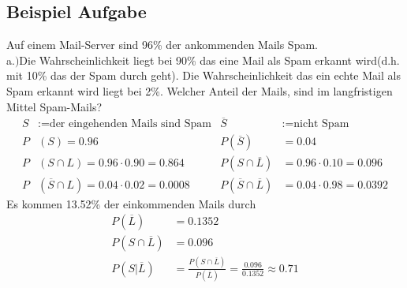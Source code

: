\subsection*{Beispiel Aufgabe}
Auf einem Mail-Server sind 96\% der ankommenden Mails Spam.\\
a.$)$Die Wahrscheinlichkeit liegt bei 90\% das eine Mail als Spam erkannt wird(d.h. mit 10\% das der Spam durch geht). Die Wahrscheinlichkeit das ein echte Mail als Spam erkannt wird liegt bei 2\%. Welcher Anteil der Mails, sind im langfristigen Mittel Spam-Mails?
\begin{align*}
    S&:= \textrm{der eingehenden Mails sind Spam} &\overline{S}&:= \textrm{nicht Spam}\\
    P&(S)=0.96 &P(\overline{S})&=0.04\\
    P&(S\cap L)= 0.96\cdot 0.90=0.864  &P(S\cap\overline{L})&=0.96\cdot0.10 = 0.096\\
    P&(\overline{S}\cap L)= 0.04\cdot 0.02 = 0.0008 &P(\overline{S}\cap\overline{L})&=0.04\cdot0.98 = 0.0392
\end{align*}
Es kommen 13.52\% der einkommenden Mails durch
\begin{align*}
    P(\overline{L})&= 0.1352\\
    P(S\cap\overline{L})&= 0.096\\
    P(S|\overline{L})&= \frac{P(S\cap \overline{L})}{P(\overline{L})} = \frac{0.096}{0.1352}\approx  0.71
\end{align*}
